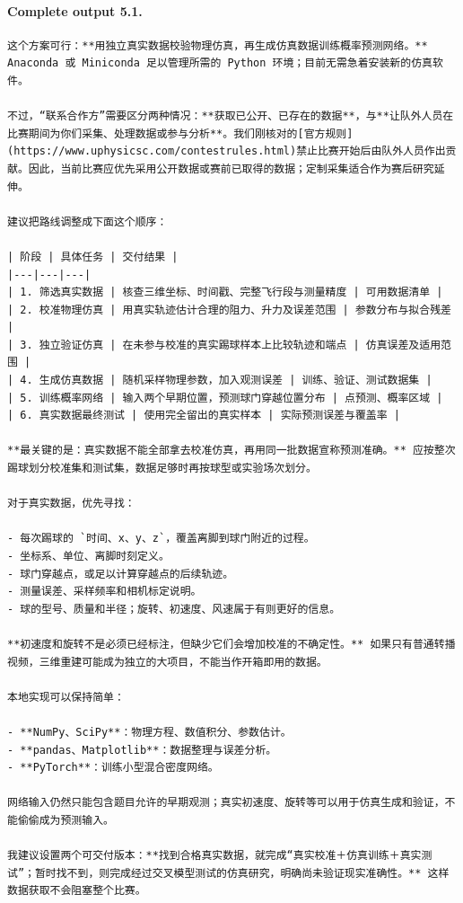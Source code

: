\documentclass[UTF8,10pt]{ctexart}
\begin{document}
\paragraph{Complete output 5.1.}
\begin{Verbatim}[breaklines=true,breakanywhere=true,fontsize=\scriptsize,frame=single,framesep=2pt]
这个方案可行：**用独立真实数据校验物理仿真，再生成仿真数据训练概率预测网络。** Anaconda 或 Miniconda 足以管理所需的 Python 环境；目前无需急着安装新的仿真软件。

不过，“联系合作方”需要区分两种情况：**获取已公开、已存在的数据**，与**让队外人员在比赛期间为你们采集、处理数据或参与分析**。我们刚核对的[官方规则](https://www.uphysicsc.com/contestrules.html)禁止比赛开始后由队外人员作出贡献。因此，当前比赛应优先采用公开数据或赛前已取得的数据；定制采集适合作为赛后研究延伸。

建议把路线调整成下面这个顺序：

| 阶段 | 具体任务 | 交付结果 |
|---|---|---|
| 1. 筛选真实数据 | 核查三维坐标、时间戳、完整飞行段与测量精度 | 可用数据清单 |
| 2. 校准物理仿真 | 用真实轨迹估计合理的阻力、升力及误差范围 | 参数分布与拟合残差 |
| 3. 独立验证仿真 | 在未参与校准的真实踢球样本上比较轨迹和端点 | 仿真误差及适用范围 |
| 4. 生成仿真数据 | 随机采样物理参数，加入观测误差 | 训练、验证、测试数据集 |
| 5. 训练概率网络 | 输入两个早期位置，预测球门穿越位置分布 | 点预测、概率区域 |
| 6. 真实数据最终测试 | 使用完全留出的真实样本 | 实际预测误差与覆盖率 |

**最关键的是：真实数据不能全部拿去校准仿真，再用同一批数据宣称预测准确。** 应按整次踢球划分校准集和测试集，数据足够时再按球型或实验场次划分。

对于真实数据，优先寻找：

- 每次踢球的 `时间、x、y、z`，覆盖离脚到球门附近的过程。
- 坐标系、单位、离脚时刻定义。
- 球门穿越点，或足以计算穿越点的后续轨迹。
- 测量误差、采样频率和相机标定说明。
- 球的型号、质量和半径；旋转、初速度、风速属于有则更好的信息。

**初速度和旋转不是必须已经标注，但缺少它们会增加校准的不确定性。** 如果只有普通转播视频，三维重建可能成为独立的大项目，不能当作开箱即用的数据。

本地实现可以保持简单：

- **NumPy、SciPy**：物理方程、数值积分、参数估计。
- **pandas、Matplotlib**：数据整理与误差分析。
- **PyTorch**：训练小型混合密度网络。

网络输入仍然只能包含题目允许的早期观测；真实初速度、旋转等可以用于仿真生成和验证，不能偷偷成为预测输入。

我建议设置两个可交付版本：**找到合格真实数据，就完成“真实校准＋仿真训练＋真实测试”；暂时找不到，则完成经过交叉模型测试的仿真研究，明确尚未验证现实准确性。** 这样数据获取不会阻塞整个比赛。
\end{Verbatim}
\end{document}

